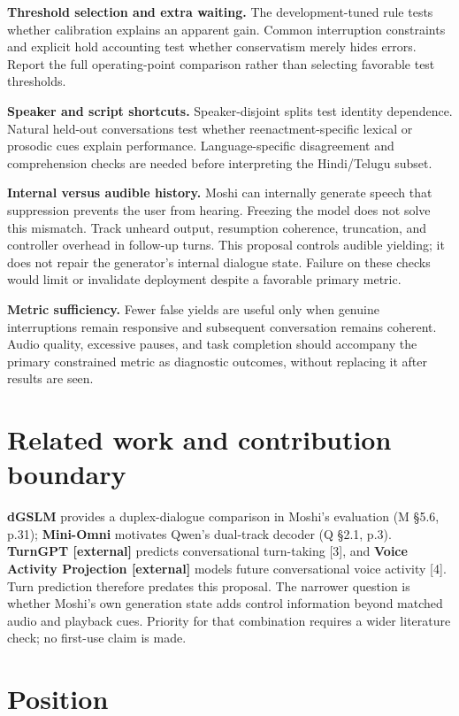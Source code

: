 \documentclass[11pt]{article}
\begin{document}
\textbf{Threshold selection and extra waiting.} The development-tuned rule tests whether calibration explains an apparent gain. Common interruption constraints and explicit hold accounting test whether conservatism merely hides errors. Report the full operating-point comparison rather than selecting favorable test thresholds.

\textbf{Speaker and script shortcuts.} Speaker-disjoint splits test identity dependence. Natural held-out conversations test whether reenactment-specific lexical or prosodic cues explain performance. Language-specific disagreement and comprehension checks are needed before interpreting the Hindi/Telugu subset.

\textbf{Internal versus audible history.} Moshi can internally generate speech that suppression prevents the user from hearing. Freezing the model does not solve this mismatch. Track unheard output, resumption coherence, truncation, and controller overhead in follow-up turns. This proposal controls audible yielding; it does not repair the generator's internal dialogue state. Failure on these checks would limit or invalidate deployment despite a favorable primary metric.

\textbf{Metric sufficiency.} Fewer false yields are useful only when genuine interruptions remain responsive and subsequent conversation remains coherent. Audio quality, excessive pauses, and task completion should accompany the primary constrained metric as diagnostic outcomes, without replacing it after results are seen.

\section{Related work and contribution boundary}

\textbf{dGSLM} provides a duplex-dialogue comparison in Moshi's evaluation (M §5.6, p.31); \textbf{Mini-Omni} motivates Qwen's dual-track decoder (Q §2.1, p.3). \textbf{TurnGPT [external]} predicts conversational turn-taking [3], and \textbf{Voice Activity Projection [external]} models future conversational voice activity [4]. Turn prediction therefore predates this proposal. The narrower question is whether Moshi's own generation state adds control information beyond matched audio and playback cues. Priority for that combination requires a wider literature check; no first-use claim is made.

\section{Position}
\end{document}
